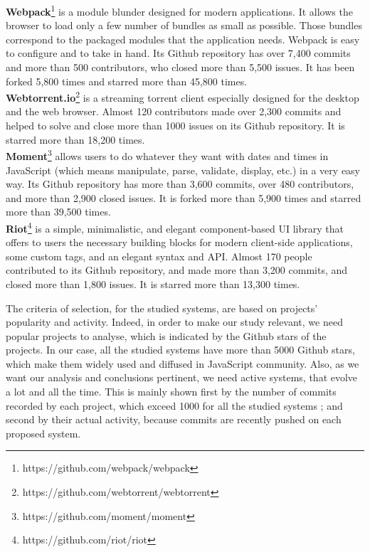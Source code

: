 \documentclass[smallcondensed]{svjour3}
\begin{document}
\textbf{Webpack}\footnote{https://github.com/webpack/webpack} is a module blunder designed for modern applications. It allows the browser to load only a few number of bundles as small as possible. Those bundles correspond to the packaged modules that the application needs. Webpack is easy to configure and to take in hand. Its Github repository has over 7,400 commits and more than 500 contributors, who closed more than 5,500 issues. It has been forked 5,800 times and starred more than 45,800 times.\\
\textbf{Webtorrent.io}\footnote{https://github.com/webtorrent/webtorrent} is a streaming torrent client especially designed for the desktop and the web browser. Almost 120 contributors made over 2,300 commits and helped to solve and close more than 1000 issues on its Github repository. It is starred more than 18,200 times.\\
\textbf{Moment}\footnote{https://github.com/moment/moment} allows users to do whatever they want with dates and times in JavaScript (which means manipulate, parse, validate, display, etc.) in a very easy way. Its Github repository has more than 3,600 commits, over 480 contributors, and more than 2,900 closed issues. It is forked more than 5,900 times and starred more than 39,500 times.\\
\textbf{Riot}\footnote{https://github.com/riot/riot} is a simple, minimalistic, and elegant component-based UI library that offers to users the necessary building blocks for modern client-side applications, some custom tags, and an elegant syntax and API. Almost 170 people contributed to its Github repository, and made more than 3,200 commits, and closed more than 1,800 issues. It is starred more than 13,300 times.

{\color{blue}The criteria of selection, for the studied systems, are based on projects' popularity and activity. Indeed, in order to make our study relevant, we need popular projects to analyse, which is indicated by the Github stars of the projects. In our case, all the studied systems have more than 5000 Github stars, which make them widely used and diffused in JavaScript community. Also, as we want our analysis and conclusions pertinent, we need active systems, that evolve a lot and all the time. This is mainly shown first by the number of commits recorded by each project, which exceed 1000 for all the studied systems ; and second by their actual activity, because commits are recently pushed on each proposed system.}

\end{document}
